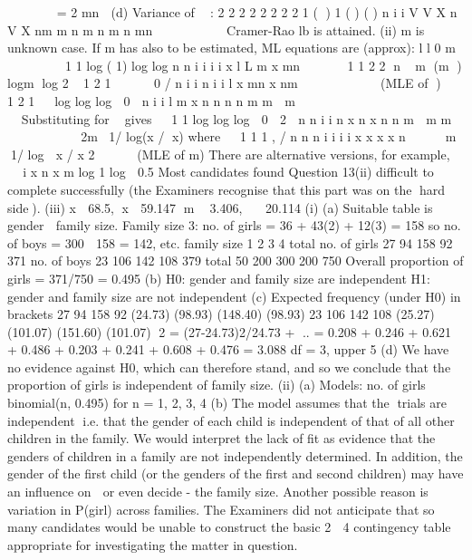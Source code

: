 \documentclass[a4paper,12pt]{article}
\begin{document}
    

=
2
mn

(d) Variance of  :
2 2
2 2 2 2 2 2
1
( ) 1 ( ) ( )
n
i
i
V V X n V X nm
m n m n m n mn 
 
     
Cramer-Rao lb is attained.
(ii) m is unknown case.
If m has also to be estimated, ML equations are (approx):
l l 0
m
 
 
 
  1
1 log ( 1) log log
n
n i i
i i
x
l L m x mn 

     



1 1
2 2 n m (m ) logm log 2
1
2 1
     0 /
n
i i n
i i
l x mn x nm 


    
  

 (MLE of )
 
1
2
1
  log log log  0

n
i i
l m x n n n n m
m  m
   
     		    
 

Substituting for 
gives
 
1
1 log log log  0
 2 
n n
i i
n x n x n n m
 m m
 
     
 	

2m 1/ log(x / x) where  
1
1 1 , / n n n
i i i i x x x x n
 
   
 m 1/ log  x / x 2   
 (MLE of m)
There are alternative versions, for example,
 

i x
n
x
m
log 1 log
 0.5
Most candidates found Question 13(ii) difficult to complete successfully (the Examiners
recognise that this part was on the hard side).
(iii) x  68.5, x  59.147 m  3.406,   20.114
 (i) (a) Suitable table is gender  family size.
Family size 3: no. of girls = 36 + 43(2) + 12(3) = 158
so no. of boys = 300  158 = 142, etc.
family size
1 2 3 4 total
no. of girls 27 94 158 92 371
no. of boys 23 106 142 108 379
total 50 200 300 200 750
Overall proportion of girls = 371/750 = 0.495
(b) H0: gender and family size are independent
H1: gender and family size are not independent
(c) Expected frequency (under H0) in brackets
27 94 158 92
(24.73) (98.93) (148.40) (98.93)
23 106 142 108
(25.27) (101.07) (151.60) (101.07)
2 = (27-24.73)2/24.73 + ..
= 0.208 + 0.246 + 0.621 + 0.486 +
0.203 + 0.241 + 0.608 + 0.476 = 3.088
df = 3, upper 5%
(d) We have no evidence against H0, which can therefore stand, and so we
conclude that the proportion of girls is independent of family size.
(ii) (a) Models: no. of girls ~ binomial(n, 0.495) for n = 1, 2, 3, 4
(b) The model assumes that the trials are independent i.e. that the gender
of each child is independent of that of all other children in the family.
We would interpret the lack of fit as evidence that the genders of
children in a family are not independently determined.
In addition, the gender of the first child (or the genders of the first and
second children) may have an influence on  or even decide - the
family size.
Another possible reason is variation in P(girl) across families.
The Examiners did not anticipate that so many candidates would be unable to construct the
basic 2  4 contingency table appropriate for investigating the matter in question.
\end{document}
